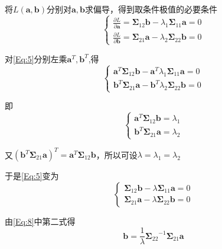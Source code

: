 \documentclass[withoutpreface]{cumcmthesis}
\begin{document}
将$L(\mathbf{a},\mathbf{b})$分别对$\mathbf{a},\mathbf{b}$求偏导，得到取条件极值的必要条件
\begin{equation}\label{Eq:5}
    \begin{cases}\frac{\partial L}{\partial \mathbf{a}}={\boldsymbol{\Sigma}_{12}}\mathbf{b}-\lambda_1{\boldsymbol{\Sigma}_{11}}\mathbf{a}=0 \\
        \frac{\partial L}{\partial \mathbf{b}}={\boldsymbol{\Sigma}_{21}}\mathbf{a}-\lambda_2{\boldsymbol{\Sigma}_{22}}\mathbf{b}=0
    \end{cases}
\end{equation}

对\cref{Eq:5}分别左乘$\mathbf{a}^T,\mathbf{b}^T$,得
\begin{equation}\label{Eq:6}
    \begin{cases}\mathbf{a}^T{\boldsymbol{\Sigma}_{12}}\mathbf{b}-\mathbf{a}^T\lambda_1{\boldsymbol{\Sigma}_{11}}\mathbf{a}=0 \\
        \mathbf{b}^T{\boldsymbol{\Sigma}_{21}}\mathbf{a}-\mathbf{b}^T\lambda_2{\boldsymbol{\Sigma}_{22}}\mathbf{b}=0
    \end{cases}
\end{equation}

即
\begin{equation}\label{Eq:7}
    \begin{cases}\mathbf{a}^T{\boldsymbol{\Sigma}_{12}}\mathbf{b}=\lambda_1 \\
        \mathbf{b}^T{\boldsymbol{\Sigma}_{21}}\mathbf{a}=\lambda_2
    \end{cases}
\end{equation}

又$(\mathbf{b}^T{\boldsymbol{\Sigma}_{21}}\mathbf{a})^T=\mathbf{a}^T{\boldsymbol{\Sigma}_{12}}\mathbf{b}$，所以可设$\lambda=\lambda_1=\lambda_2$

于是\cref{Eq:5}变为
\begin{equation}\label{Eq:8}
    \begin{cases}{\boldsymbol{\Sigma}_{12}}\mathbf{b}-\lambda{\boldsymbol{\Sigma}_{11}}\mathbf{a}=0 \\
        {\boldsymbol{\Sigma}_{21}}\mathbf{a}-\lambda{\boldsymbol{\Sigma}_{22}}\mathbf{b}=0
    \end{cases}
\end{equation}

由\cref{Eq:8}中第二式得
\begin{equation}\label{Eq:9}
    \mathbf{b}=\frac{1}{\lambda}{\boldsymbol{\Sigma}_{22}}^{-1} {\boldsymbol{\Sigma}_{21}}\mathbf{a}
\end{equation}
\end{document}
